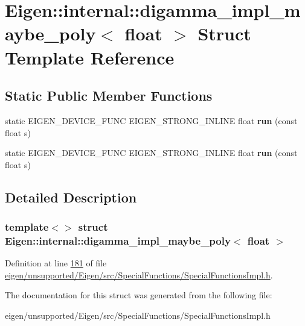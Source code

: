 \hypertarget{struct_eigen_1_1internal_1_1digamma__impl__maybe__poly_3_01float_01_4}{}\section{Eigen\+:\+:internal\+:\+:digamma\+\_\+impl\+\_\+maybe\+\_\+poly$<$ float $>$ Struct Template Reference}
\label{struct_eigen_1_1internal_1_1digamma__impl__maybe__poly_3_01float_01_4}
\subsection*{Static Public Member Functions}
\begin{DoxyCompactItemize}
\item 
\mbox{\label{struct_eigen_1_1internal_1_1digamma__impl__maybe__poly_3_01float_01_4_a56d4e7fa57f89b38931234d49803227a}} 
static E\+I\+G\+E\+N\+\_\+\+D\+E\+V\+I\+C\+E\+\_\+\+F\+U\+NC E\+I\+G\+E\+N\+\_\+\+S\+T\+R\+O\+N\+G\+\_\+\+I\+N\+L\+I\+NE float {\bfseries run} (const float s)
\item 
\mbox{\label{struct_eigen_1_1internal_1_1digamma__impl__maybe__poly_3_01float_01_4_a56d4e7fa57f89b38931234d49803227a}} 
static E\+I\+G\+E\+N\+\_\+\+D\+E\+V\+I\+C\+E\+\_\+\+F\+U\+NC E\+I\+G\+E\+N\+\_\+\+S\+T\+R\+O\+N\+G\+\_\+\+I\+N\+L\+I\+NE float {\bfseries run} (const float s)
\end{DoxyCompactItemize}


\subsection{Detailed Description}
\subsubsection*{template$<$$>$\newline
struct Eigen\+::internal\+::digamma\+\_\+impl\+\_\+maybe\+\_\+poly$<$ float $>$}



Definition at line \hyperlink{eigen_2unsupported_2_eigen_2src_2_special_functions_2_special_functions_impl_8h_source_l00181}{181} of file \hyperlink{eigen_2unsupported_2_eigen_2src_2_special_functions_2_special_functions_impl_8h_source}{eigen/unsupported/\+Eigen/src/\+Special\+Functions/\+Special\+Functions\+Impl.\+h}.



The documentation for this struct was generated from the following file\+:\begin{DoxyCompactItemize}
\item 
eigen/unsupported/\+Eigen/src/\+Special\+Functions/\+Special\+Functions\+Impl.\+h\end{DoxyCompactItemize}
